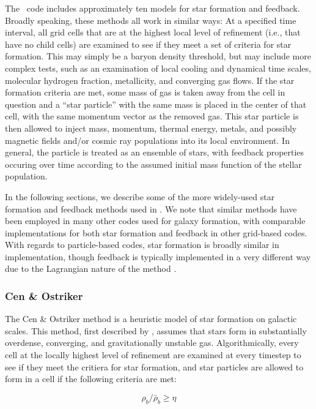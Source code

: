 The \enzo\ code includes approximately ten models for star formation
and feedback.  Broadly speaking, these methods all work in similar
ways: At a specified time interval, all grid cells that are at the
highest local level of refinement (i.e., that have no child cells) are
examined to see if they meet a set of criteria for star formation.
This may simply be a baryon density threshold, but may include more
complex tests, such as an examination of local cooling and dynamical
time scales, molecular hydrogen fraction, metallicity, and converging
gas flows.  If the star formation criteria are met, some mass of gas
is taken away from the cell in question and a ``star particle'' with
the same mass is placed in the center of that cell, with the same
momentum vector as the removed gas.  This star particle is then
allowed to inject mass, momentum, thermal energy, metals, and possibly
magnetic fields and/or cosmic ray populations into its local
environment.  In general, the particle is treated as an ensemble of
stars, with feedback properties occuring over time according to the
assumed initial mass function of the stellar population.

In the following sections, we describe some of the more widely-used
star formation and feedback methods used in \enzo.  We note that
similar methods have been employed in many other codes used for galaxy
formation, with comparable implementations for both star formation and
feedback in other grid-based codes.  With regards to particle-based
codes, star formation is broadly similar in implementation, though
feedback is typically implemented in a very different way due to the
Lagrangian nature of the method \citep[see,
e.g.,][]{sh03a,sh03b,hs03}.

\subsubsection{Cen \& Ostriker}
\label{sec:starform_cen}

The Cen \& Ostriker method is a heuristic model of star formation on
galactic scales.  This method, first described by \citet{CO1992},
assumes that stars form in substantially overdense, converging, and
gravitationally unstable gas.  Algorithmically, every cell at the
locally highest level of refinement are examined at every timestep to
see if they meet the critiera for star formation, and star particles
are allowed to form in a cell if the following criteria are met:

\begin{equation}
\rho_b/\bar{\rho}_b \geq \eta
\label{cendens}
\end{equation} 


